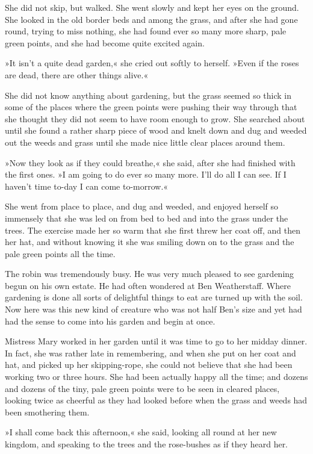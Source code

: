 She did not skip, but walked. She went slowly and kept her eyes on the ground. She looked in the old border beds and among the grass, and after she had gone round, trying to miss nothing, she had found ever so many more sharp, pale green points, and she had become quite excited again.

»It isn't a quite dead garden,« she cried out softly to herself. »Even if the roses are dead, there are other things alive.«

She did not know anything about gardening, but the grass seemed so thick in some of the places where the green points were pushing their way through that she thought they did not seem to have room enough to grow. She searched about until she found a rather sharp piece of wood and knelt down and dug and weeded out the weeds and grass until she made nice little clear places around them.

»Now they look as if they could breathe,« she said, after she had finished with the first ones. »I am going to do ever so many more. I'll do all I can see. If I haven't time to-day I can come to-morrow.«

She went from place to place, and dug and weeded, and enjoyed herself so immensely that she was led on from bed to bed and into the grass under the trees. The exercise made her so warm that she first threw her coat off, and then her hat, and without knowing it she was smiling down on to the grass and the pale green points all the time.

The robin was tremendously busy. He was very much pleased to see gardening begun on his own estate. He had often wondered at Ben Weatherstaff. Where gardening is done all sorts of delightful things to eat are turned up with the soil. Now here was this new kind of creature who was not half Ben's size and yet had had the sense to come into his garden and begin at once.

Mistress Mary worked in her garden until it was time to go to her midday dinner. In fact, she was rather late in remembering, and when she put on her coat and hat, and picked up her skipping-rope, she could not believe that she had been working two or three hours. She had been actually happy all the time; and dozens and dozens of the tiny, pale green points were to be seen in cleared places, looking twice as cheerful as they had looked before when the grass and weeds had been smothering them.

»I shall come back this afternoon,« she said, looking all round at her new kingdom, and speaking to the trees and the rose-bushes as if they heard her.

